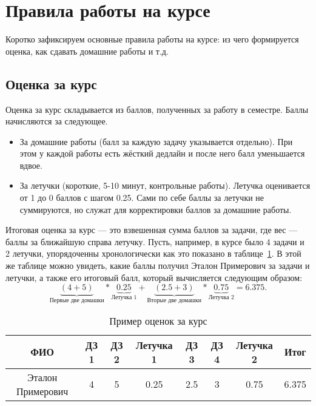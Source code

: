 \section{Правила работы на курсе}

Коротко зафиксируем основные правила работы на курсе: из чего формируется оценка, как сдавать домашние работы и т.д.

\subsection{Оценка за курс}

Оценка за курс складывается из баллов, полученных за работу в семестре. Баллы начисляются за следующее.
\begin{itemize}
    \item За домашние работы (балл за каждую задачу указывается отдельно). При этом у каждой работы есть жёсткий дедлайн и после него балл уменьшается вдвое.
    \item За летучки (короткие, 5-10 минут, контрольные работы). Летучка оценивается от 1 до 0 баллов с шагом 0.25. Сами по себе баллы за летучки не суммируются, но служат для корректировки баллов за домашние работы.
\end{itemize}

Итоговая оценка за курс --- это взвешенная сумма баллов за задачи, где вес --- баллы за ближайшую справа летучку.
Пусть, например, в курсе было 4 задачи и 2 летучки, упорядоченны хронологически как это показано в таблице~\ref{tbl:grad_example}.
В этой же таблице можно увидеть, какие баллы получил Эталон Примерович за задачи и летучки, а также его итоговый балл, который вычисляется следующим образом:
$$
\underbrace{(4+5)}_{\text{Первые две домашки}}*\underbrace{0.25}_{\text{Летучка 1}} + \underbrace{(2.5+3)}_{\text{Вторые две домашки}}*\underbrace{0.75}_{\text{Летучка 2}} = 6.375.
$$

\begin{table}[h]
    \caption{Пример оценок за курс}
    \label{tbl:grad_example}
\begin{center}
    \begin{tabular}{ | c | c | c | c | c | c | c | c |}
        \hline
        ФИО & ДЗ 1 & ДЗ 2 & Летучка 1 & ДЗ 3 & ДЗ 4 & Летучка 2 &  Итог \\
        \hline
        \hline
        Эталон Примерович & 4 & 5 & 0.25 & 2.5 & 3 & 0.75 & 6.375 \\
        \hline
    \end{tabular}
\end{center}
\end{table}


